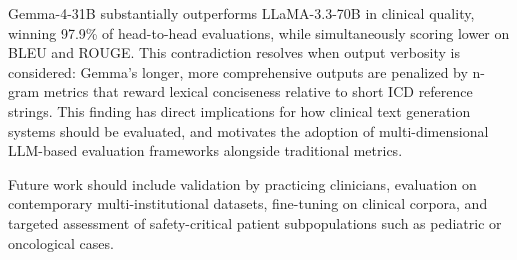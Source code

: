 \documentclass[10pt, twocolumn, a4paper]{article}
\begin{document}
Gemma-4-31B substantially outperforms LLaMA-3.3-70B in clinical quality, winning 97.9\% of head-to-head evaluations, while simultaneously scoring lower on BLEU and ROUGE. This contradiction resolves when output verbosity is considered: Gemma's longer, more comprehensive outputs are penalized by n-gram metrics that reward lexical conciseness relative to short ICD reference strings. This finding has direct implications for how clinical text generation systems should be evaluated, and motivates the adoption of multi-dimensional LLM-based evaluation frameworks alongside traditional metrics.

Future work should include validation by practicing clinicians, evaluation on contemporary multi-institutional datasets, fine-tuning on clinical corpora, and targeted assessment of safety-critical patient subpopulations such as pediatric or oncological cases.
\end{document}
